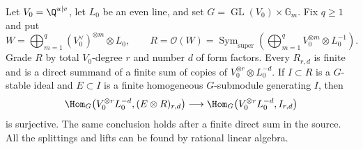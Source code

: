 \begin{lemma}
\label{c:covariant-polynomial-lifting}
Let $V_0=\Q^{u|v}$, let $L_0$ be an even line, and set
$G=\operatorname{GL}(V_0)\times\mathbb G_m$.  Fix $q\geq1$ and put
\[
 W=\bigoplus_{m=1}^{q}(V_0^\vee)^{\otimes m}\otimes L_0,
 \qquad R=\mathcal O(W)
 =\operatorname{Sym}_{\mathrm{super}}
       \left(\bigoplus_{m=1}^{q}V_0^{\otimes m}\otimes L_0^{-1}\right).
\]
Grade $R$ by total $V_0$-degree $r$ and number $d$ of form factors.
Every $R_{r,d}$ is finite and is a direct summand of a finite sum
of copies of $V_0^{\otimes r}\otimes L_0^{-d}$.
If $I\subset R$ is a $G$-stable ideal and $E\subset I$ is a finite
homogeneous $G$-submodule generating $I$, then
\begin{equation}
 \Hom_G\bigl(V_0^{\otimes r}L_0^{-d},(E\otimes R)_{r,d}\bigr)
 \longrightarrow
 \Hom_G\bigl(V_0^{\otimes r}L_0^{-d},I_{r,d}\bigr)
 \label{eq:c-polynomial-lift}
\end{equation}
is surjective.  The same conclusion holds after a finite direct
sum in the source.  All the splittings and lifts can be found by
rational linear algebra.
\end{lemma}

